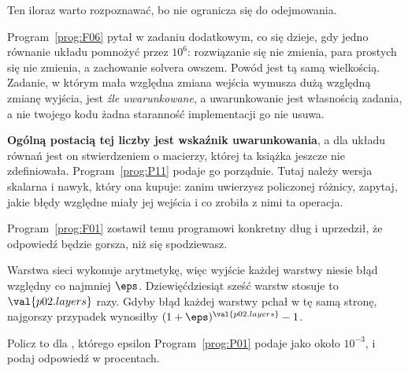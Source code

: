 \begin{fr}

Ten iloraz warto rozpoznawać, bo nie ogranicza się do odejmowania.

Program~\ref{prog:F06} pytał w zadaniu dodatkowym, co się dzieje, gdy jedno
równanie układu pomnożyć przez $10^{6}$: rozwiązanie się nie zmienia, para
prostych się nie zmienia, a zachowanie solvera owszem. Powód jest tą samą
wielkością. Zadanie, w którym mała względna zmiana wejścia wymusza dużą
względną zmianę wyjścia, jest \emph{źle uwarunkowane}, a uwarunkowanie jest
własnością zadania, a nie twojego kodu \dash{} żadna staranność implementacji
go nie usuwa.

\begin{rigourbox}
\textbf{Ogólną postacią tej liczby jest wskaźnik uwarunkowania}, a dla układu
równań jest on stwierdzeniem o macierzy, której ta książka jeszcze nie
zdefiniowała. Program~\ref{prog:P11} podaje go porządnie. Tutaj należy wersja
skalarna i nawyk, który ona kupuje: zanim uwierzysz policzonej różnicy, zapytaj,
jakie błędy względne miały jej wejścia i co zrobiła z nimi ta operacja.
\end{rigourbox}
\end{fr}

\begin{fr}
Program~\ref{prog:F01} zostawił temu programowi konkretny dług i uprzedził, że
odpowiedź będzie gorsza, niż się spodziewasz.

Warstwa sieci wykonuje arytmetykę, więc wyjście każdej warstwy niesie błąd
względny co najmniej $\eps$. Dziewięćdziesiąt sześć warstw stosuje to
$\val{p02.layers}$ razy. Gdyby błąd każdej warstwy pchał w tę samą stronę,
najgorszy przypadek wynosiłby $(1 + \eps)^{\val{p02.layers}} - 1$.

Policz to dla , którego epsilon Program~\ref{prog:P01} podaje jako
około $10^{-3}$, i podaj odpowiedź w procentach.
\nextframe
\end{fr}

